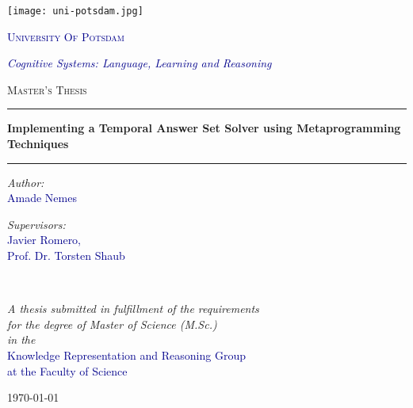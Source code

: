 \begin{titlepage}
    \begin{center}
    
    \begin{center}
      \texttt{[image: uni-potsdam.jpg]}
    \end{center}
    \vspace*{.008\textheight}
    {\scshape\LARGE \textcolor{darkblue}{University Of Potsdam}\par}
    
    \large 
    \textcolor{darkblue}{\emph{Cognitive Systems: Language, Learning and Reasoning}}
    
    \vspace{1.5cm}
    \textsc{\Large Master's Thesis}\\[0.5cm]
    
    \noindent\rule{\textwidth}{0.3mm}
    {\huge \bfseries Implementing a Temporal Answer Set Solver using Metaprogramming Techniques\par}\vspace{0.4cm}
    \noindent\rule{\textwidth}{0.3mm}
     
    \vspace*{.005\textheight}
    \begin{minipage}[t]{0.4\textwidth}
    \begin{flushleft} \large
    \emph{Author:}\\
    {\textcolor{darkblue}{Amade Nemes}}\\
    \end{flushleft}
    \end{minipage}
    \begin{minipage}[t]{0.4\textwidth}
    \begin{flushright} \large
    \emph{Supervisors:} \\
    {\textcolor{darkblue}{Javier Romero, \\Prof. Dr. Torsten Shaub}}
    \end{flushright}
    \end{minipage}\\[2.3cm]
     
    \vfill
    
    \large \textit{A thesis submitted in fulfillment of the requirements\\ for the degree of Master of Science (M.Sc.)}\\[0.3cm]
    \textit{in the}\\[0.4cm]
    \textcolor{darkblue}{Knowledge Representation and Reasoning Group \\ at the Faculty of Science } \\[1cm]
     
    \vfill
    
    {\large \today}\\[4cm]
     
    \vfill
    \end{center}
    \end{titlepage}
